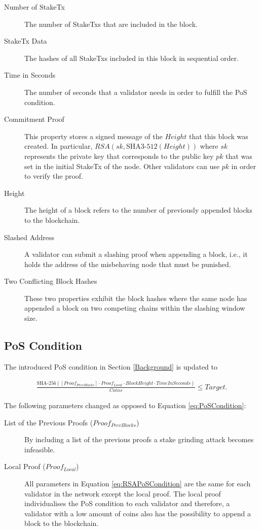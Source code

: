 \documentclass[12pt,a4]{article}
\begin{document}
\begin{description}
  \item[Number of StakeTx] The number of StakeTxs that are included in the block.
  \item[StakeTx Data] The hashes of all StakeTxs included in this block in sequential order.
  \item[Time in Seconds] The number of seconds that a validator needs in order to fulfill the PoS condition.
  \item[Commitment Proof] This property stores a signed message of the $Height$ that this block was created. In particular, $RSA(sk, \text{SHA3-512}(Height))$ where $sk$ represents the private key that corresponds to the public key $pk$ that was set in the initial StakeTx of the node. Other validators can use $pk$ in order to verify the proof.
  \item[Height] The height of a block refers to the number of previously appended blocks to the blockchain.
  \item[Slashed Address] A validator can submit a slashing proof when appending a block, i.e., it holds the address of the misbehaving node that must be punished.
  \item[Two Conflicting Block Hashes] These two properties exhibit the block hashes where the same node has appended a block on two competing chains within the slashing window size.
\end{description}

\subsection{PoS Condition}
\label{Implementation:PoSCondition}

The introduced PoS condition in Section \ref{Background} is updated to

\begin{gather}
\label{eq:RSAPoSCondition}
  {\frac{\text{SHA-256}([Proof_{PrevBlocks}] \cdot Proof_{Local} \cdot BlockHeight \cdot TimeInSeconds)}{Coins}} \leq Target.
\end{gather}

\noindent
The following parameters changed as opposed to Equation \ref{eq:PoSCondition}:

\begin{description}
  \item[List of the Previous Proofs ($Proof_{PrevBlocks}$)] By including a list of the previous proofs a stake grinding attack becomes infeasible.
  \item[Local Proof ($Proof_{Local}$)] All parameters in Equation \ref{eq:RSAPoSCondition} are the same for each validator in the network except the local proof. The local proof individualises the PoS condition to each validator and therefore, a validator with a low amount of coins also has the possibility to append a block to the blockchain.
\end{description}
\end{document}
